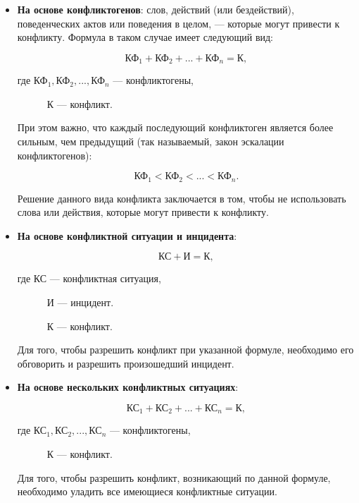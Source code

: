 \begin{itemize}
    \item \textbf{На основе конфликтогенов}: слов, действий (или бездействий),
        поведенческих актов или поведения в целом, --- которые могут привести
        к конфликту. Формула в таком случае имеет следующий вид:
        
        $$ \text{КФ}_1 + \text{КФ}_2 + ... + \text{КФ}_n = \text{К}, $$

      где $\text{КФ}_1, \text{КФ}_2, ..., \text{КФ}_n$ --- конфликтогены,
      
      ~~~~~~$\text{К}$ --- конфликт.

      При этом важно, что каждый последующий конфликтоген является более
      сильным, чем предыдущий (так называемый, закон эскалации
      конфликтогенов):

      $$\text{КФ}_1 < \text{КФ}_2 < ... < \text{КФ}_n.$$

      Решение данного вида конфликта заключается в том, чтобы не
      использовать слова или действия, которые могут привести к конфликту.
  \item \textbf{На основе конфликтной ситуации и инцидента}:

      $$\text{КС} + \text{И} = \text{К},$$

     где $\text{КС}$ --- конфликтная ситуация,

       ~~~~~~$\text{И}$ --- инцидент.

       ~~~~~~$\text{К}$ --- конфликт.

    Для того, чтобы разрешить конфликт при указанной формуле, необходимо
    его обговорить и разрешить произошедший инцидент.
    
\item \textbf{На основе нескольких конфликтных ситуациях}:

        $$ \text{КС}_1 + \text{КС}_2 + ... + \text{КС}_n = \text{К}, $$

      где $\text{КС}_1, \text{КС}_2, ..., \text{КС}_n$ --- конфликтогены,
      
      ~~~~~~$\text{К}$ --- конфликт.

      Для того, чтобы разрешить конфликт, возникающий по данной формуле,
      необходимо уладить все имеющиеся конфликтные ситуации.
\end{itemize}


